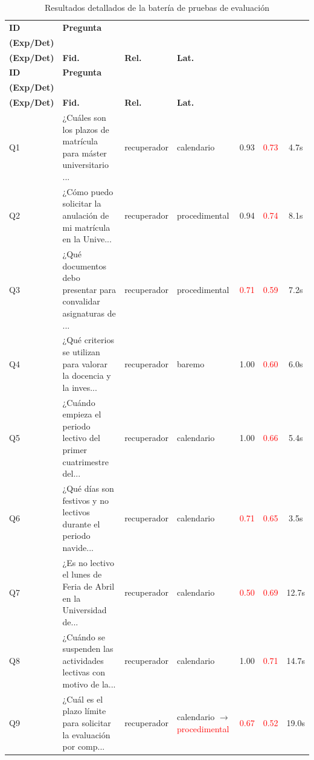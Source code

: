 \documentclass[12pt,a4paper,oneside]{report}
\begin{document}
\small
\begin{longtable}{p{0.6cm} p{5.0cm} p{2.6cm} p{2.6cm} c c c}
\caption{Resultados detallados de la batería de pruebas de evaluación} \label{tab:bateria_completa} \\
\toprule
\textbf{ID} & \textbf{Pregunta} & \shortstack{\textbf{Intención} \\ \textbf{(Exp/Det)}} & \shortstack{\textbf{Categoría} \\ \textbf{(Exp/Det)}} & \textbf{Fid.} & \textbf{Rel.} & \textbf{Lat.} \\ \midrule
\endfirsthead
\midrule
\textbf{ID} & \textbf{Pregunta} & \shortstack{\textbf{Intención} \\ \textbf{(Exp/Det)}} & \shortstack{\textbf{Categoría} \\ \textbf{(Exp/Det)}} & \textbf{Fid.} & \textbf{Rel.} & \textbf{Lat.} \\ \midrule
\endhead
\midrule
\endfoot
\bottomrule
\endlastfoot
Q1 & ¿Cuáles son los plazos de matrícula para máster universitario ... & recuperador & calendario & 0.93 & \textcolor{red}{0.73} & 4.7s \\
Q2 & ¿Cómo puedo solicitar la anulación de mi matrícula en la Unive... & recuperador & procedimental & 0.94 & \textcolor{red}{0.74} & 8.1s \\
Q3 & ¿Qué documentos debo presentar para convalidar asignaturas de ... & recuperador & procedimental & \textcolor{red}{0.71} & \textcolor{red}{0.59} & 7.2s \\
Q4 & ¿Qué criterios se utilizan para valorar la docencia y la inves... & recuperador & baremo & 1.00 & \textcolor{red}{0.60} & 6.0s \\
Q5 & ¿Cuándo empieza el periodo lectivo del primer cuatrimestre del... & recuperador & calendario & 1.00 & \textcolor{red}{0.66} & 5.4s \\
Q6 & ¿Qué días son festivos y no lectivos durante el periodo navide... & recuperador & calendario & \textcolor{red}{0.71} & \textcolor{red}{0.65} & 3.5s \\
Q7 & ¿Es no lectivo el lunes de Feria de Abril en la Universidad de... & recuperador & calendario & \textcolor{red}{0.50} & \textcolor{red}{0.69} & 12.7s \\
Q8 & ¿Cuándo se suspenden las actividades lectivas con motivo de la... & recuperador & calendario & 1.00 & \textcolor{red}{0.71} & 14.7s \\
Q9 & ¿Cuál es el plazo límite para solicitar la evaluación por comp... & recuperador & calendario $\rightarrow$ \textcolor{red}{procedimental} & \textcolor{red}{0.67} & \textcolor{red}{0.52} & 19.0s \\

\end{longtable}
\end{document}
